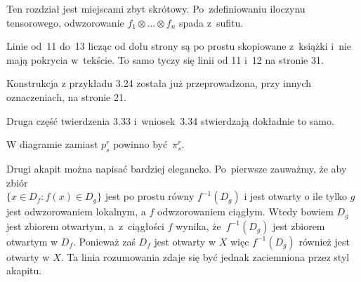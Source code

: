 \documentclass[a4paper,11pt]{article}
\begin{document}
\vspace{\spaceFour}





\noindent
{} Ten rozdział jest miejscami zbyt skrótowy. Po~zdefiniowaniu
iloczynu tensorowego, odwzorowanie $f_{ 1 } \otimes \ldots \otimes f_{ n }$ spada z~sufitu.

\vspace{\spaceFour}





\noindent
{} Linie od~11 do~13 licząc od dołu strony są po prostu skopiowane
z~książki \cite{GancarzewiczAlgebraLiniowa2004} i~nie mają pokrycia
w~tekście. To samo tyczy się linii od 11 i~12 na stronie 31.

\vspace{\spaceFour}





\noindent
{} Konstrukcja z przykładu 3.24 została już przeprowadzona, przy
innych oznaczeniach, na stronie 21.

\vspace{\spaceFour}





\noindent
{} Druga część twierdzenia 3.33 i~wniosek~3.34 stwierdzają dokładnie
to samo.

\vspace{\spaceFour}





\noindent
{} W diagramie zamiast $p^{ r }_{ s }$ powinno być~$\pi^{ r }_{ s }$.

\vspace{\spaceFour}





\noindent
{} Drugi akapit można napisać bardziej elegancko. Po~pierwsze
zauważmy, że aby zbiór \\
$\{ x \in D_{ f } : f( x ) \in D_{ g } \}$ jest po prostu równy
$f^{ -1 }( D_{ g } )$ i jest otwarty o ile tylko $g$ jest
odwzorowaniem lokalnym, a $f$ odwzorowaniem ciągłym. Wtedy bowiem
$D_{ g }$ jest zbiorem otwartym, a~z~ciągłości $f$ wynika,
że~$f^{ -1 }( D_{ g } )$ jest zbiorem otwartym w $D_{ f }$. Ponieważ
zaś $D_{ f }$ jest otwarty w $X$ więc $f^{ -1 }( D_{ g } )$ również
jest otwarty w $X$. Ta linia rozumowania zdaje się być jednak
zaciemniona przez styl akapitu.
\end{document}
